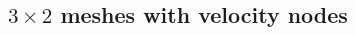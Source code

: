 \newpage
\subsection*{$3\times 2$ meshes with velocity nodes}

\begin{multicols}{2}


\begin{tiny}

\end{tiny}
\end{multicols}

\begin{multicols}{2}


\begin{tiny}

\end{tiny}
\end{multicols}

\begin{multicols}{2}


\begin{tiny}

\end{tiny}
\end{multicols}

\newpage
\begin{multicols}{2}


\begin{tiny}

\end{tiny}
\end{multicols}




\newpage
\begin{multicols}{2}


\begin{tiny}

\end{tiny}
\end{multicols}

